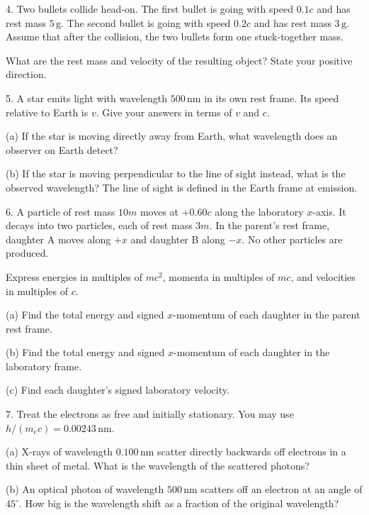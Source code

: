 \documentclass[12pt,letterpaper]{article}
\begin{document}
4. Two bullets collide head-on. The first bullet is going with speed $0.1c$ and has rest mass $5\,\mathrm{g}$. The second bullet is going with speed $0.2c$ and has rest mass $3\,\mathrm{g}$. Assume that after the collision, the two bullets form one stuck-together mass.

What are the rest mass and velocity of the resulting object? State your positive direction.

\vfill
\newpage

5. A star emits light with wavelength $500\,\mathrm{nm}$ in its own rest frame. Its speed relative to Earth is $v$. Give your answers in terms of $v$ and $c$.

(a) If the star is moving directly away from Earth, what wavelength does an observer on Earth detect?

\vfill

(b) If the star is moving perpendicular to the line of sight instead, what is the observed wavelength? The line of sight is defined in the Earth frame at emission.

\vfill
\newpage

6. A particle of rest mass $10m$ moves at $+0.60c$ along the laboratory $x$-axis. It decays into two particles, each of rest mass $3m$. In the parent's rest frame, daughter A moves along $+x$ and daughter B along $-x$. No other particles are produced.

Express energies in multiples of $mc^2$, momenta in multiples of $mc$, and velocities in multiples of $c$.

(a) Find the total energy and signed $x$-momentum of each daughter in the parent rest frame.

\vfill

(b) Find the total energy and signed $x$-momentum of each daughter in the laboratory frame.

\vfill

(c) Find each daughter's signed laboratory velocity.

\vfill
\newpage

7. Treat the electrons as free and initially stationary. You may use $h/(m_ec)=0.00243\,\mathrm{nm}$.

(a) X-rays of wavelength $0.100\,\mathrm{nm}$ scatter directly backwards off electrons in a thin sheet of metal. What is the wavelength of the scattered photons?

\vfill

(b) An optical photon of wavelength $500\,\mathrm{nm}$ scatters off an electron at an angle of $45^\circ$. How big is the wavelength shift as a fraction of the original wavelength?
\end{document}
